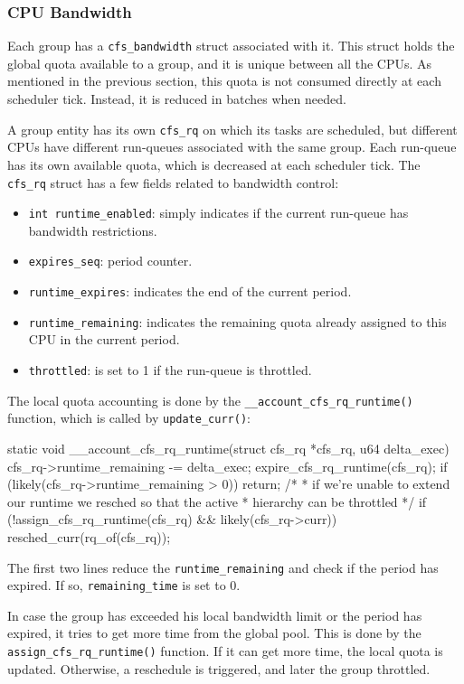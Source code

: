 \subsubsection{CPU Bandwidth}
Each group has a \verb|cfs_bandwidth| struct associated with it. This struct holds the global quota available to a group, and it is unique between all the CPUs. As mentioned in the previous section, this quota is not consumed directly at each scheduler tick. Instead, it is reduced in batches when needed.

A group entity has its own \verb|cfs_rq| on which its tasks are scheduled, but different CPUs have different run-queues associated with the same group. Each run-queue has its own available quota, which is decreased at each scheduler tick. The \verb|cfs_rq| struct has a few fields related to bandwidth control:
\begin{itemize}
    \item \verb|int runtime_enabled|: simply indicates if the current run-queue has bandwidth restrictions.
    \item \verb|expires_seq|: period counter.
    \item \verb|runtime_expires|: indicates the end of the current period.
    \item \verb|runtime_remaining|: indicates the remaining quota already assigned to this CPU in the current period.
    \item \verb|throttled|: is set to 1 if the run-queue is throttled.
\end{itemize}

The local quota accounting is done by the \verb|__account_cfs_rq_runtime()| function, which is called by \verb|update_curr()|:
\begin{code}
static void __account_cfs_rq_runtime(struct cfs_rq *cfs_rq, u64 delta_exec)
{
	cfs_rq->runtime_remaining -= delta_exec;
	expire_cfs_rq_runtime(cfs_rq);
	if (likely(cfs_rq->runtime_remaining > 0))
		return;
	/*
	 * if we're unable to extend our runtime we resched so that the active
	 * hierarchy can be throttled
	 */
	if (!assign_cfs_rq_runtime(cfs_rq) && likely(cfs_rq->curr))
		resched_curr(rq_of(cfs_rq));
}
\end{code}

The first two lines reduce the \verb|runtime_remaining| and check if the period has expired. If so, \verb|remaining_time| is set to 0.

In case the group has exceeded his local bandwidth limit or the period has expired, it tries to get more time from the global pool. This is done by the \verb|assign_cfs_rq_runtime()| function. If it can get more time, the local quota is updated. Otherwise, a reschedule is triggered, and later the group throttled.

